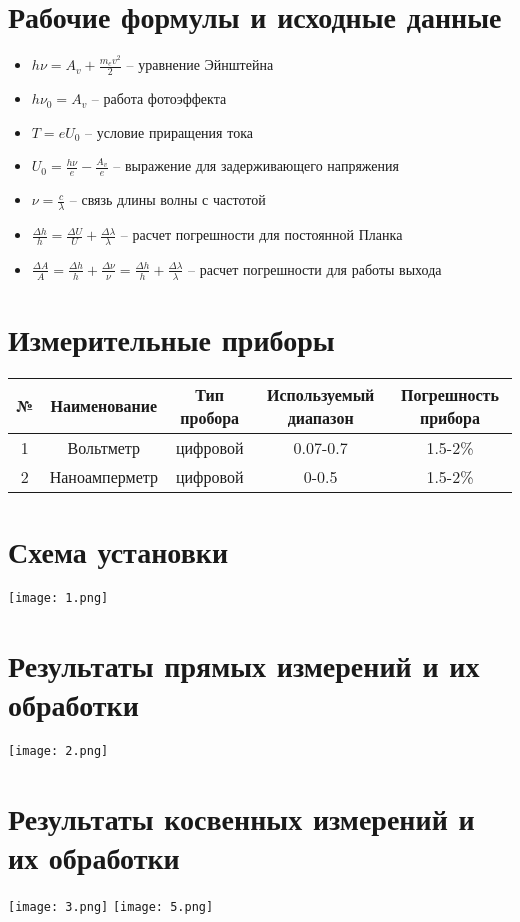 \documentclass[12pt, a4paper]{article}
\begin{document}
\section{Рабочие формулы и исходные данные}
\begin{itemize}
    \item $h\nu = A_{v} + \frac{m_e v^2}{2}$ -- уравнение Эйнштейна
    \item $h\nu_{0} = A_{v}$ -- работа фотоэффекта
    \item $T = eU_0$ -- условие приращения тока
    \item $U_0 = \frac{h\nu}{e} - \frac{A_{v}}{e}$ -- выражение для задерживающего напряжения
    \item $\nu = \frac{c}{\lambda}$ -- связь длины волны с частотой
    \item $\frac{\Delta h}{h} = \frac{\Delta U}{U} + \frac{\Delta \lambda}{\lambda}$ -- расчет погрешности для постоянной Планка
    \item $\frac{\Delta A}{A} = \frac{\Delta h}{h} + \frac{\Delta \nu}{\nu} = \frac{\Delta h}{h} + \frac{\Delta \lambda}{\lambda}$ -- расчет погрешности для работы выхода
\end{itemize}

\section{Измерительные приборы}
\begin{tabular}{|c|c|c|c|c| }
     \hline № & Наименование & Тип пробора  & Используемый диапазон  &Погрешность прибора \\
     \hline 1  &  Вольтметр  & цифровой & 0.07-0.7 & 1.5-2\% \\
     \hline 2 & Наноамперметр  &  цифровой  &  0-0.5  &  1.5-2\% \\
     \hline
\end{tabular}

\section{Схема установки}
\texttt{[image: 1.png]}

\section{Результаты прямых измерений и их обработки}

\texttt{[image: 2.png]}

\section{Результаты косвенных измерений и их обработки}
\texttt{[image: 3.png]}
\newline
\texttt{[image: 5.png]}
\end{document}
